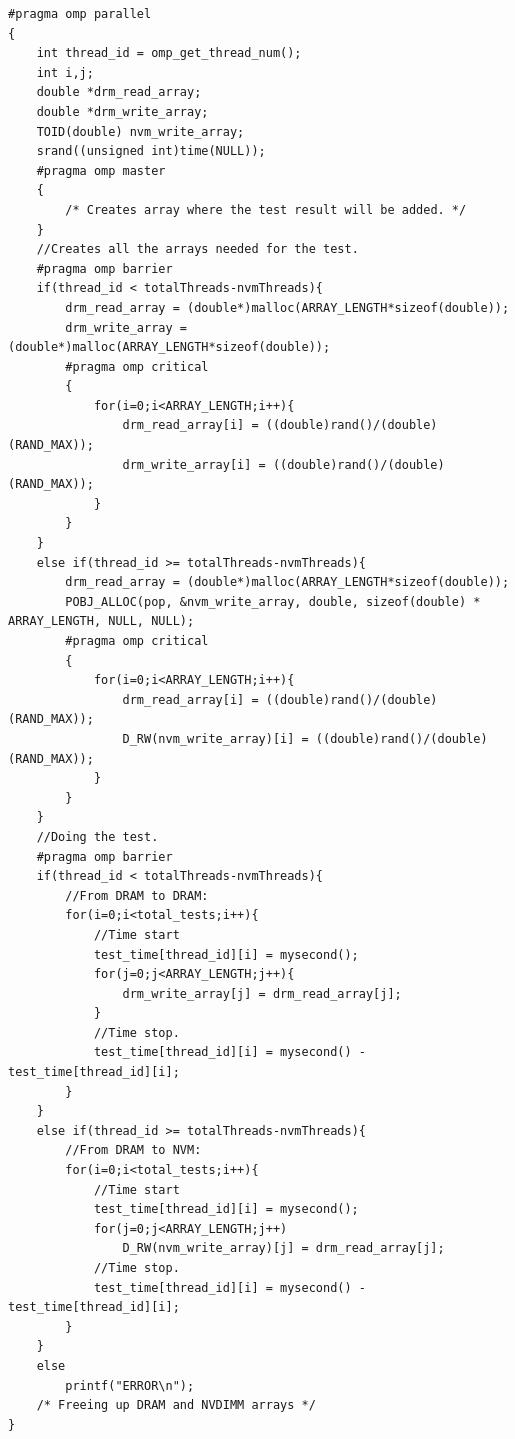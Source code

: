\documentclass[12pt,a4paper,USenglish]{article}      %
\begin{document}
\begin{lstlisting}[caption={DRAM-NVM source code},escapeinside={{/*!}{!*/}}]
#pragma omp parallel
{
	int thread_id = omp_get_thread_num();
	int i,j;
	double *drm_read_array;
	double *drm_write_array;
	TOID(double) nvm_write_array;
	srand((unsigned int)time(NULL));
	#pragma omp master
	{
		/* Creates array where the test result will be added. */
	}
	//Creates all the arrays needed for the test.
	#pragma omp barrier
	if(thread_id < totalThreads-nvmThreads){
		drm_read_array = (double*)malloc(ARRAY_LENGTH*sizeof(double));
    	drm_write_array = (double*)malloc(ARRAY_LENGTH*sizeof(double));
		#pragma omp critical
		{
			for(i=0;i<ARRAY_LENGTH;i++){
				drm_read_array[i] = ((double)rand()/(double)(RAND_MAX));
				drm_write_array[i] = ((double)rand()/(double)(RAND_MAX));
			}
		}
	}
	else if(thread_id >= totalThreads-nvmThreads){
		drm_read_array = (double*)malloc(ARRAY_LENGTH*sizeof(double));
    	POBJ_ALLOC(pop, &nvm_write_array, double, sizeof(double) * ARRAY_LENGTH, NULL, NULL);
		#pragma omp critical
		{
			for(i=0;i<ARRAY_LENGTH;i++){
				drm_read_array[i] = ((double)rand()/(double)(RAND_MAX));
				D_RW(nvm_write_array)[i] = ((double)rand()/(double)(RAND_MAX));
			}
		}
	}
	//Doing the test.
	#pragma omp barrier
	if(thread_id < totalThreads-nvmThreads){
		//From DRAM to DRAM:
		for(i=0;i<total_tests;i++){
			//Time start
			test_time[thread_id][i] = mysecond();	
			for(j=0;j<ARRAY_LENGTH;j++){
				drm_write_array[j] = drm_read_array[j];
			}
			//Time stop.
			test_time[thread_id][i] = mysecond() - test_time[thread_id][i];
		}
	}
	else if(thread_id >= totalThreads-nvmThreads){
		//From DRAM to NVM:
		for(i=0;i<total_tests;i++){
			//Time start
			test_time[thread_id][i] = mysecond();
			for(j=0;j<ARRAY_LENGTH;j++)
				D_RW(nvm_write_array)[j] = drm_read_array[j];		
			//Time stop.
			test_time[thread_id][i] = mysecond() - test_time[thread_id][i];
		}
	}
	else
		printf("ERROR\n");
	/* Freeing up DRAM and NVDIMM arrays */
}
\end{lstlisting}
\end{document}
